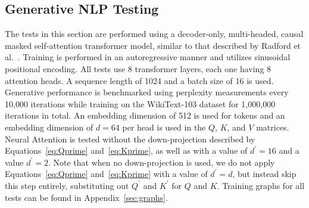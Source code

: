 \documentclass{article}
\begin{document}
\subsection{Generative NLP Testing}
\label{subsec:NLP_Testing}
The tests in this section are performed using a decoder-only, multi-headed, causal masked self-attention transformer model, similar to that described by Radford et al.~\cite{radford2018improving}. Training is performed in an autoregressive manner and utilizes sinusoidal positional encoding. All tests use 8 transformer layers, each one having 8 attention heads. A sequence length of 1024 and a batch size of 16 is used. Generative performance is benchmarked using perplexity measurements every 10,000 iterations while training on the WikiText-103 dataset for 1,000,000 iterations in total. An embedding dimension of 512 is used for tokens and an embedding dimension of $d=64$ per head is used in the $Q$, $K$, and $V$ matrices. Neural Attention is tested without the down-projection described by Equations~\ref{eq:Qprime} and~\ref{eq:Kprime}, as well as with a value of $d^{\prime}=16$ and a value $d^{\prime}=2$. Note that when no down-projection is used, we do not apply Equations~\ref{eq:Qprime} and~\ref{eq:Kprime} with a value of $d^{\prime}=d$, but instead skip this step entirely, substituting out $Q^{\prime}$ and $K^{\prime}$ for $Q$ and $K$. Training graphs for all tests can be found in Appendix~\ref{sec:graphs}.
\end{document}
